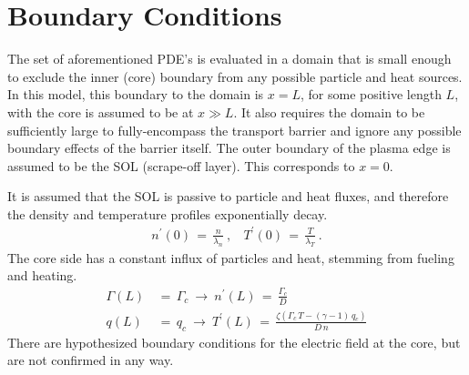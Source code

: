 \section{Boundary Conditions}\label{sec:boundary_conditions}
The set of aforementioned PDE's is evaluated in a domain that is small enough to exclude the inner (core) boundary from any possible particle and heat sources.
In this model, this boundary to the domain is $x = L$, for some positive length $L$, with the core is assumed to be at $x \gg L$.
It also requires the domain to be sufficiently large to fully-encompass the transport barrier and ignore any possible boundary effects of the barrier itself.
The outer boundary of the plasma edge is assumed to be the SOL (scrape-off layer).
This corresponds to $x = 0$.

It is assumed that the SOL is passive to particle and heat fluxes, and therefore the density and temperature profiles exponentially decay.
\begin{align} %
	n^\prime(0) \,=\, \frac{n}{\lambda_n}~, ~~~~
		T^\prime(0) \,=\, \frac{T}{\lambda_T}~.\label{eq:nT_SOL_boundary}
\end{align}
The core side has a constant influx of particles and heat, stemming from fueling and heating.
\begin{align} %
	\Gamma(L) \,&=\, \Gamma_c ~\longrightarrow~ n^\prime(L)
		\,=\, \frac{\Gamma_c}{D} \label{eq:core_particle_flux}\\
	q(L) \,&=\, q_c ~\longrightarrow~ T^\prime(L) \,=\, \frac{\zeta(
		\Gamma_c \, T - (\gamma - 1)\,q_c)}{D \, n} \label{eq:core_heat_flux}
\end{align}
There are hypothesized boundary conditions for the electric field at the core, but are not confirmed in any way.


